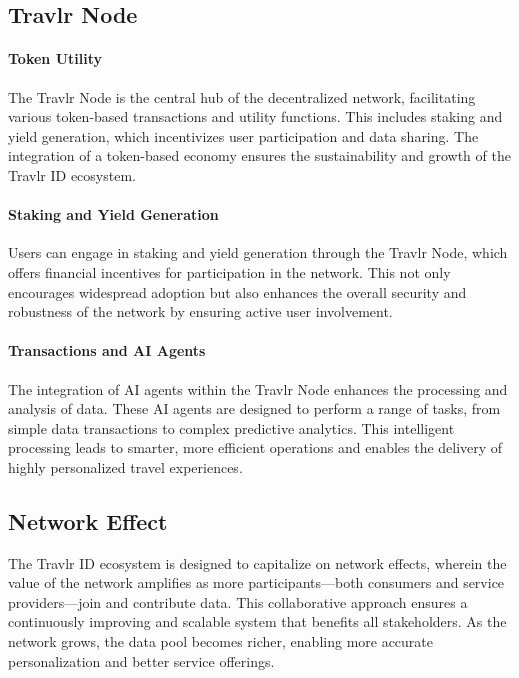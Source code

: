 \documentclass{article}
\begin{document}
\subsection{Travlr Node}

\paragraph{Token Utility}

The Travlr Node is the central hub of the decentralized network, facilitating various token-based transactions and utility functions. This includes staking and yield generation, which incentivizes user participation and data sharing. The integration of a token-based economy ensures the sustainability and growth of the Travlr ID ecosystem.

\paragraph{Staking and Yield Generation}

Users can engage in staking and yield generation through the Travlr Node, which offers financial incentives for participation in the network. This not only encourages widespread adoption but also enhances the overall security and robustness of the network by ensuring active user involvement.

\paragraph{Transactions and AI Agents}

The integration of AI agents within the Travlr Node enhances the processing and analysis of data. These AI agents are designed to perform a range of tasks, from simple data transactions to complex predictive analytics. This intelligent processing leads to smarter, more efficient operations and enables the delivery of highly personalized travel experiences.

\subsection{Network Effect}

The Travlr ID ecosystem is designed to capitalize on network effects, wherein the value of the network amplifies as more participants—both consumers and service providers—join and contribute data. This collaborative approach ensures a continuously improving and scalable system that benefits all stakeholders. As the network grows, the data pool becomes richer, enabling more accurate personalization and better service offerings.
\end{document}
